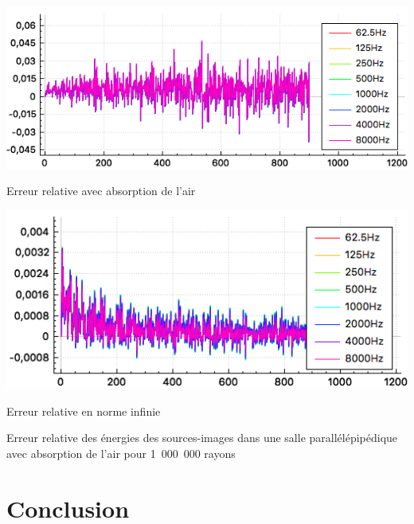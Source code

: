 \begin{figureth}
	\begin{subfigureth}{0.8\textwidth}
		\includegraphics[width=\linewidth]{images/test3_8}
		\caption{Erreur relative avec absorption de l'air}
		\label{test3_8}
	\end{subfigureth}
	\begin{subfigureth}{0.8\textwidth}
		\includegraphics[width=\linewidth]{images/test3_9}
		\caption{Erreur relative en norme infinie}
		\label{test3_9}
	\end{subfigureth}
	\caption{Erreur relative des énergies des sources-images dans une salle parallélépipédique avec absorption de l'air pour 1~000~000 rayons}
\end{figureth}


	
\chapter*{Conclusion}

